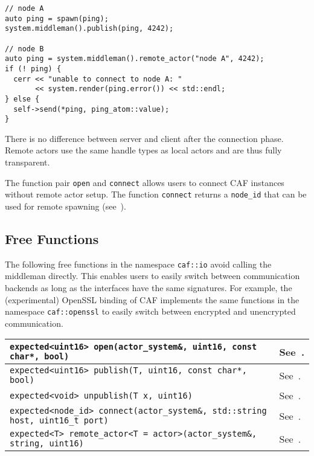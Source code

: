 \begin{lstlisting}
// node A
auto ping = spawn(ping);
system.middleman().publish(ping, 4242);

// node B
auto ping = system.middleman().remote_actor("node A", 4242);
if (! ping) {
  cerr << "unable to connect to node A: "
       << system.render(ping.error()) << std::endl;
} else {
  self->send(*ping, ping_atom::value);
}
\end{lstlisting}

There is no difference between server and client after the connection phase. Remote actors use the same handle types as local actors and are thus fully transparent.

The function pair \lstinline^open^ and \lstinline^connect^ allows users to connect CAF instances without remote actor setup. The function \lstinline^connect^ returns a \lstinline^node_id^ that can be used for remote spawning (see~).

\subsection{Free Functions}
\label{free-remoting-functions}

The following free functions in the namespace \lstinline^caf::io^ avoid calling the middleman directly. This enables users to easily switch between communication backends as long as the interfaces have the same signatures. For example, the (experimental) OpenSSL binding of CAF implements the same functions in the namespace \lstinline^caf::openssl^ to easily switch between encrypted and unencrypted communication.

\begin{center}\small
\begin{tabular}{ll}
  \hline
  \lstinline^expected<uint16> open(actor_system&, uint16, const char*, bool)^ & See~. \\
  \hline
  \lstinline^expected<uint16> publish(T, uint16, const char*, bool)^ & See~. \\
  \hline
  \lstinline^expected<void> unpublish(T x, uint16)^ & See~. \\
  \hline
  \lstinline^expected<node_id> connect(actor_system&, std::string host, uint16_t port)^ & See~. \\
  \hline
  \lstinline^expected<T> remote_actor<T = actor>(actor_system&, string, uint16)^ & See~. \\
  \hline
\end{tabular}
\end{center}
